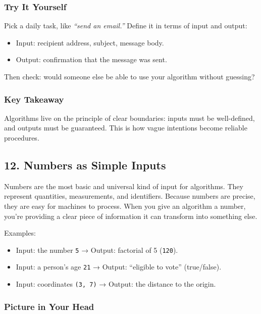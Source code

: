 \documentclass[
  letterpaper,
  DIV=11,
  numbers=noendperiod]{scrreprt}
\providecommand{\tightlist}{%
  \setlength{\itemsep}{0pt}\setlength{\parskip}{0pt}}
\begin{document}
\subsubsection{Try It Yourself}\label{try-it-yourself-10}

Pick a daily task, like \emph{``send an email.''} Define it in terms of
input and output:

\begin{itemize}
\tightlist
\item
  Input: recipient address, subject, message body.
\item
  Output: confirmation that the message was sent.
\end{itemize}

Then check: would someone else be able to use your algorithm without
guessing?

\subsubsection{Key Takeaway}\label{key-takeaway-9}

Algorithms live on the principle of clear boundaries: inputs must be
well-defined, and outputs must be guaranteed. This is how vague
intentions become reliable procedures.

\subsection{12. Numbers as Simple
Inputs}\label{numbers-as-simple-inputs}

Numbers are the most basic and universal kind of input for algorithms.
They represent quantities, measurements, and identifiers. Because
numbers are precise, they are easy for machines to process. When you
give an algorithm a number, you're providing a clear piece of
information it can transform into something else.

Examples:

\begin{itemize}
\tightlist
\item
  Input: the number \texttt{5} → Output: factorial of 5 (\texttt{120}).
\item
  Input: a person's age \texttt{21} → Output: ``eligible to vote''
  (true/false).
\item
  Input: coordinates \texttt{(3,\ 7)} → Output: the distance to the
  origin.
\end{itemize}

\subsubsection{Picture in Your Head}\label{picture-in-your-head-11}
\end{document}
